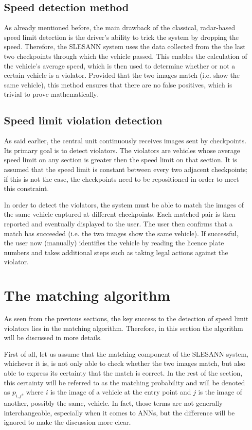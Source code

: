 \documentclass[times, utf8, zavrsni]{fer}
\begin{document}
\subsection{Speed detection method}
As already mentioned before, the main drawback of the classical, radar-based
speed limit detection is the driver's ability to trick the system by dropping
the speed. Therefore, the SLESANN system uses the data collected from the the
last two checkpoints through which the vehicle passed. This enables the
calculation of the vehicle's average speed, which is then used to determine
whether or not a certain vehicle is a violator. Provided that the two images
match (i.e. show the same vehicle), this method ensures that there are no false
positives, which is trivial to prove mathematically.

\subsection{Speed limit violation detection}
As said earlier, the central unit continuously receives images sent by
checkpoints. Its primary goal is to detect violators. The violators are vehicles
whose average speed limit on any section is greater then the speed limit on that
section. It is assumed that the speed limit is constant between every two
adjacent checkpoints; if this is not the case, the checkpoints need to be
repositioned in order to meet this constraint.

In order to detect the violators, the system must be able to match the images of
the same vehicle captured at different checkpoints. Each matched pair is then
reported and eventually displayed to the user. The user then confirms that a 
match has succeeded (i.e. the two images show the same vehicle). If successful, 
the user now (manually) identifies the vehicle by reading the licence plate 
numbers and takes additional steps such as taking legal actions against the 
violator.


\section{The matching algorithm}
\label{section:matching-algorithm}

As seen from the previous sections, the key success to the detection of speed
limit violators lies in the matching algorithm. Therefore, in this section the
algorithm will be discussed in more details.

First of all, let us assume that the matching component of the SLESANN system,
whichever it is, is not only able to check whether the two images match, but
also able to express its certainty that the match is correct. In the rest of the
section, this certainty will be referred to as the matching probability and
will be denoted as $p_{i, j}$, where $i$ is the image of a vehicle at the entry
point and $j$ is the image of another, possibly the same, vehicle. In fact,
those terms are not generally interchangeable, especially when it comes to
ANNs, but the difference will be ignored to make the discussion more clear.
\end{document}
